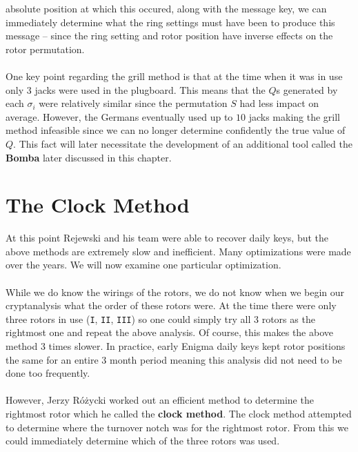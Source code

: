 absolute position at which this occured, along with the message key,
we can immediately determine what the ring settings must have been to
produce this message -- since the ring setting and rotor position
have inverse effects on the rotor permutation.
\\\\One key point regarding the grill method is that at the time when
it was in use only $3$ jacks were used in the plugboard. This means
that the $Q$s generated by each $\sigma_i$ were relatively similar
since the permutation $S$ had less impact on average. However, the
Germans eventually used up to $10$ jacks making the grill method
infeasible since we can no longer determine confidently the true
value of $Q$. This fact will later necessitate the development of an
additional tool called the {\bf{Bomba}} later discussed in this chapter.
\section{The Clock Method}\label{clock_method}

At this point Rejewski and his team were able to recover daily keys,
but the above methods are extremely slow and inefficient. Many
optimizations were made over the years. We will now examine one
particular optimization.
\\\\While we do know the wirings of the rotors, we do not know when
we begin our cryptanalysis what the order of these rotors were. At
the time there were only three rotors in use (\texttt{I},
\texttt{II}, \texttt{III}) so one could simply try all 3 rotors as
the rightmost one and repeat the above analysis. Of course, this
makes the above method 3 times slower. In practice, early Enigma
daily keys kept rotor positions the same for an entire 3 month period
meaning this analysis did not need to be done too frequently.
\\\\However, Jerzy Różycki worked out an efficient method to
determine the rightmost rotor which he called the {\bf{clock
			method}}. The clock method attempted to determine where the turnover
notch was for the rightmost rotor. From this we could immediately
determine which of the three rotors was used.

